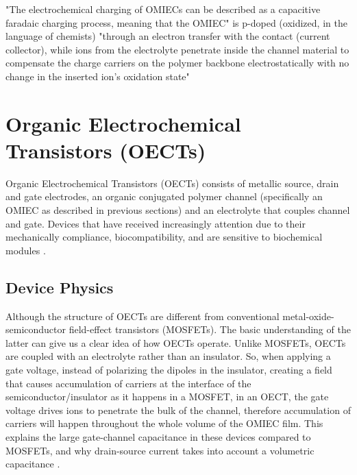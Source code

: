 "The electrochemical charging of OMIECs can be described as a capacitive faradaic charging process,
meaning that the OMIEC" is p-doped (oxidized, in the language of chemists) "through an electron transfer with the contact (current collector), while ions from the electrolyte penetrate inside the channel material to compensate the charge carriers on the polymer backbone electrostatically with no change in the inserted ion's oxidation state" \cite{giovannittiEnergeticControlRedoxActive2020}

\section{Organic Electrochemical Transistors (OECTs)} \label{sec:OECTs}

Organic Electrochemical Transistors (OECTs) consists of metallic source, drain and gate electrodes, an organic conjugated polymer channel (specifically an OMIEC as described in previous sections) and an electrolyte that couples channel and gate. Devices that have received increasingly attention due to their mechanically compliance, biocompatibility, and are sensitive to biochemical modules \cite{tanMixedIonicElectronic2022}. 



\subsection{Device Physics}

Although the structure of OECTs are different from conventional metal-oxide-semiconductor field-effect transistors (MOSFETs). The basic understanding of the latter can give us a clear idea of how OECTs operate. Unlike MOSFETs, OECTs are coupled with an electrolyte rather than an insulator. So, when applying a gate voltage, instead of polarizing the dipoles in the insulator, creating a field that causes accumulation of carriers at the interface of the semiconductor/insulator as it happens in a MOSFET, in an OECT, the gate voltage drives ions to penetrate the bulk of the channel, therefore accumulation of carriers will happen throughout the whole volume of the OMIEC film. This explains the large gate-channel capacitance in these devices compared to MOSFETs, and why drain-source current takes into account a volumetric capacitance \cite{friedleinDevicePhysicsOrganic2018}.


